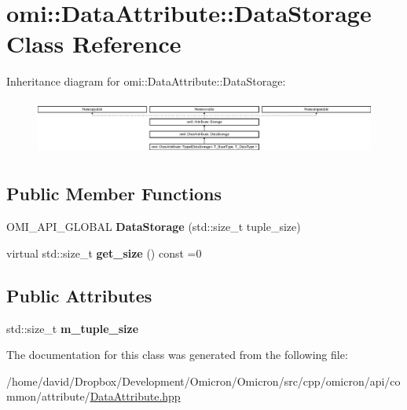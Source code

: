 \hypertarget{classomi_1_1_data_attribute_1_1_data_storage}{}\section{omi\+:\+:Data\+Attribute\+:\+:Data\+Storage Class Reference}
\label{classomi_1_1_data_attribute_1_1_data_storage}
Inheritance diagram for omi\+:\+:Data\+Attribute\+:\+:Data\+Storage\+:\begin{figure}[H]
\begin{center}
\leavevmode
\includegraphics[height=1.866667cm]{classomi_1_1_data_attribute_1_1_data_storage}
\end{center}
\end{figure}
\subsection*{Public Member Functions}
\begin{DoxyCompactItemize}
\item 
O\+M\+I\+\_\+\+A\+P\+I\+\_\+\+G\+L\+O\+B\+AL {\bfseries Data\+Storage} (std\+::size\+\_\+t tuple\+\_\+size)\hypertarget{classomi_1_1_data_attribute_1_1_data_storage_aa3019392c9bb0e5a758fb932bdd81d45}{}\label{classomi_1_1_data_attribute_1_1_data_storage_aa3019392c9bb0e5a758fb932bdd81d45}

\item 
virtual std\+::size\+\_\+t {\bfseries get\+\_\+size} () const =0\hypertarget{classomi_1_1_data_attribute_1_1_data_storage_adf3337bed7c670dbdb96fbf39790df5c}{}\label{classomi_1_1_data_attribute_1_1_data_storage_adf3337bed7c670dbdb96fbf39790df5c}

\end{DoxyCompactItemize}
\subsection*{Public Attributes}
\begin{DoxyCompactItemize}
\item 
std\+::size\+\_\+t {\bfseries m\+\_\+tuple\+\_\+size}\hypertarget{classomi_1_1_data_attribute_1_1_data_storage_aaf014e6b5375b03ca0e666bdde9012b7}{}\label{classomi_1_1_data_attribute_1_1_data_storage_aaf014e6b5375b03ca0e666bdde9012b7}

\end{DoxyCompactItemize}


The documentation for this class was generated from the following file\+:\begin{DoxyCompactItemize}
\item 
/home/david/\+Dropbox/\+Development/\+Omicron/\+Omicron/src/cpp/omicron/api/common/attribute/\hyperlink{_data_attribute_8hpp}{Data\+Attribute.\+hpp}\end{DoxyCompactItemize}
